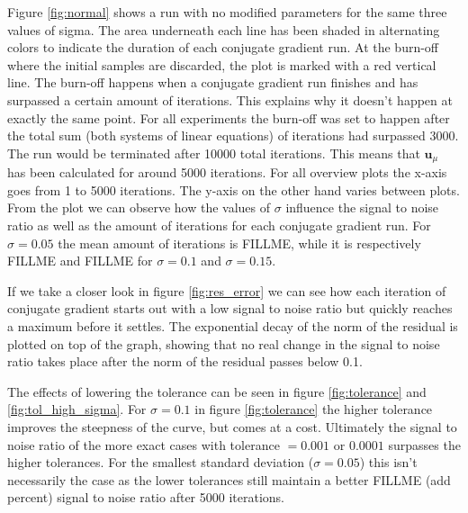 \documentclass{article}
\begin{document}
Figure \ref{fig:normal} shows a run with no modified parameters for the 
same three values of sigma.  The area underneath each line has been 
shaded in alternating colors to indicate the duration of each conjugate 
gradient run. At the burn-off where the initial samples are discarded, 
the plot is marked with a red vertical line. The burn-off happens when a 
conjugate gradient run finishes and has surpassed a certain amount of 
iterations. This explains why it doesn't happen at exactly the same 
point. For all experiments the burn-off was set to happen after the 
total sum (both systems of linear equations) of iterations had surpassed 
3000. The run would be terminated after 10000 total iterations. This 
means that $\textbf{u}_{\mu}$ has been calculated for around 5000 
iterations. For all overview plots the x-axis goes from 1 to 5000 
iterations. The y-axis on the other hand varies between plots. From the 
plot we can observe how the values of $\sigma$ influence the signal to 
noise ratio as well as the amount of iterations for each conjugate 
gradient run. For $\sigma = 0.05$ the mean amount of iterations is 
FILLME, while it is respectively FILLME and FILLME for $\sigma = 0.1$ 
and $\sigma = 0.15$.

If we take a closer look in figure \ref{fig:res_error} we can see how 
each iteration of conjugate gradient starts out with a low signal to 
noise ratio but quickly reaches a maximum before it settles. The 
exponential decay of the norm of the residual is plotted on top of the 
graph, showing that no real change in the signal to noise ratio takes 
place after the norm of the residual passes below 0.1.

The effects of lowering the tolerance can be seen in figure 
\ref{fig:tolerance} and \ref{fig:tol_high_sigma}. For $\sigma = 0.1$ in 
figure \ref{fig:tolerance} the higher tolerance improves the steepness 
of the curve, but comes at a cost. Ultimately the signal to noise ratio 
of the more exact cases with tolerance $= 0.001$ or $0.0001$ surpasses 
the higher tolerances. For the smallest standard deviation ($\sigma = 
0.05$) this isn't necessarily the case as the lower tolerances still 
maintain a better FILLME (add percent) signal to noise ratio after 5000 
iterations.
\end{document}
